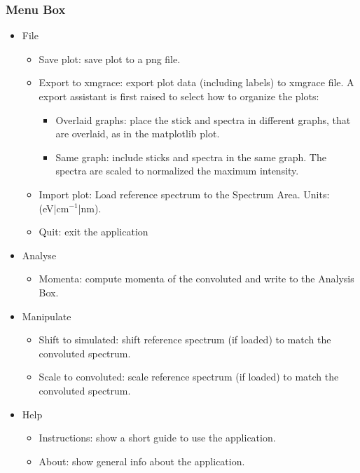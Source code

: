 \documentclass[a4paper,11pt]{article}
\begin{document}
\subsubsection{Menu Box}
\begin{itemize}
 \item File
 \begin{itemize}
  \item Save plot: save plot to a png file.
  \item Export to xmgrace: export plot data (including labels) to xmgrace file. A export assistant is first raised to select how to organize the plots:
  \begin{itemize}
   \item Overlaid graphs: place the stick and spectra in different graphs, that are overlaid, as in the matplotlib plot.
   \item Same graph: include sticks and spectra in the same graph. The spectra are scaled to normalized the maximum intensity.
  \end{itemize}

  \item Import plot: Load reference spectrum to the Spectrum Area. Units: (eV|cm$^{-1}$|nm).
  \item Quit: exit the application
 \end{itemize}

 \item Analyse
 \begin{itemize}
  \item Momenta: compute momenta of the convoluted and write to the Analysis Box.
 \end{itemize}

 \item Manipulate
 \begin{itemize}
  \item Shift to simulated: shift reference spectrum (if loaded) to match the convoluted spectrum.
  \item Scale to convoluted: scale reference spectrum (if loaded) to match the convoluted spectrum.
 \end{itemize}

 \item Help
 \begin{itemize}
  \item Instructions: show a short guide to use the application.
  \item About: show general info about the application.
 \end{itemize}
\end{itemize}
 
\end{document}
